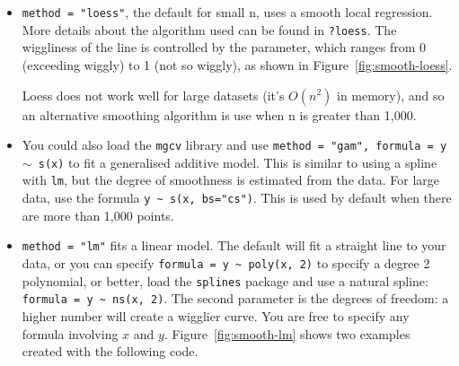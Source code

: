 \begin{itemize}
  \item {\tt method = "loess"}, the default for small n, uses a smooth local regression.  More details about the algorithm used can be found in {\tt ?loess}.  The wiggliness of the line is controlled by the  parameter, which ranges from 0 (exceeding wiggly) to 1 (not so wiggly), as shown in Figure~\ref{fig:smooth-loess}.  
  
    
  
  \noindent Loess does not work well for large datasets (it's $O(n^2)$ in memory), and so an alternative smoothing algorithm is use when n is greater than 1,000.

  \item You could also load the {\tt mgcv} library and use {\tt method = "gam", formula = y $\sim$ s(x)} to fit a generalised additive model. This is similar to using a spline with {\tt lm}, but the degree of smoothness is estimated from the data.  For large data, use the formula {\tt y \verb|~| s(x, bs="cs")}.  This is used by default when there are more than 1,000 points.

    

  \item {\tt method = "lm"} fits a linear model.  The default will fit a straight line to your data, or you can specify {\tt formula = y \verb|~| poly(x, 2)} to specify a degree 2 polynomial, or better, load the {\tt splines} package and use a natural spline: {\tt formula = y \verb|~| ns(x, 2)}. The second parameter is the degrees of freedom: a higher number will create a wigglier curve. You are free to specify any formula involving $x$ and $y$.  Figure~\ref{fig:smooth-lm} shows two examples created with the following code.  


\end{itemize}
